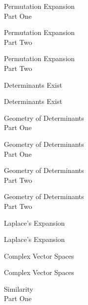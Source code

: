 \documentclass{titlescreen}
\begin{document}
\begin{videotitle}
  Permutation Expansion \\[1ex]
  Part One
\end{videotitle}
\begin{videoend}
  Permutation Expansion \\[1ex]
  Part Two
\end{videoend}

\begin{videotitle}
  Permutation Expansion \\[1ex]
  Part Two
\end{videotitle}
\begin{videoend}
  Determinants Exist
\end{videoend}

\begin{videotitle}
  Determinants Exist
\end{videotitle}
\begin{videoend}
  Geometry of Determinants \\[1ex]
  Part One
\end{videoend}

\begin{videotitle}
  Geometry of Determinants \\[1ex]
  Part One
\end{videotitle}
\begin{videoend}
  Geometry of Determinants \\[1ex]
  Part Two
\end{videoend}

\begin{videotitle}
  Geometry of Determinants \\[1ex]
  Part Two
\end{videotitle}
\begin{videoend}
  Laplace's Expansion
\end{videoend}


\begin{videotitle}
  Laplace's Expansion
\end{videotitle}
\begin{videoend}
  Complex Vector Spaces
\end{videoend}




\begin{videotitle}
  Complex Vector Spaces  
\end{videotitle}
\begin{videoend}
  Similarity \\[1ex]
  Part One
\end{videoend}
\end{document}
